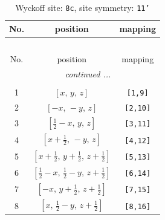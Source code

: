 \documentclass[fleqn,8pt]{jsarticle}
\begin{document}
\renewcommand{\arraystretch}{1.2}
\begin{longtable}{ccc}
\caption{Wyckoff site: {\tt 8c}, site symmetry: {\tt 11'}}
 \\
 \hline \hline
No. & position & mapping \\ \hline \endfirsthead

\multicolumn{2}{l}{\tablename\ \thetable{}} \\
 \hline \hline
No. & position & mapping \\ \hline \endhead

 \hline \hline
\multicolumn{2}{r}{\footnotesize\it continued ...} \\ \endfoot

 \hline \hline
\multicolumn{2}{r}{} \\ \endlastfoot

1 & $\left[ x,\, y,\, z \right]$ & {\tt [1,9]} \\ \hline
2 & $\left[ - x,\, - y,\, z \right]$ & {\tt [2,10]} \\ \hline
3 & $\left[ \frac{1}{2} - x,\, y,\, z \right]$ & {\tt [3,11]} \\ \hline
4 & $\left[ x + \frac{1}{2},\, - y,\, z \right]$ & {\tt [4,12]} \\ \hline
5 & $\left[ x + \frac{1}{2},\, y + \frac{1}{2},\, z + \frac{1}{2} \right]$ & {\tt [5,13]} \\ \hline
6 & $\left[ \frac{1}{2} - x,\, \frac{1}{2} - y,\, z + \frac{1}{2} \right]$ & {\tt [6,14]} \\ \hline
7 & $\left[ - x,\, y + \frac{1}{2},\, z + \frac{1}{2} \right]$ & {\tt [7,15]} \\ \hline
8 & $\left[ x,\, \frac{1}{2} - y,\, z + \frac{1}{2} \right]$ & {\tt [8,16]} \\
\end{longtable}
\end{document}
